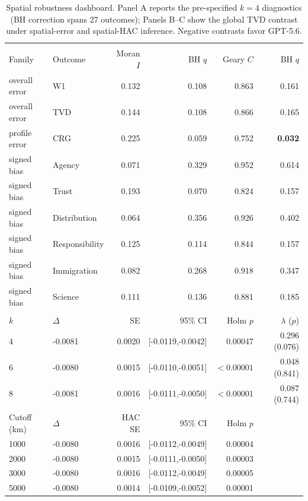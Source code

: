 \begin{table}[!htbp]
\centering
\caption{Spatial robustness dashboard. Panel A reports the pre-specified $k=4$ diagnostics (BH correction spans 27 outcomes); Panels B--C show the global TVD contrast under spatial-error and spatial-HAC inference. Negative contrasts favor GPT-5.6.}
\label{tab:spatial-global}
\small
\setlength{\tabcolsep}{3.4pt}
\begin{tabular*}{\linewidth}{@{\extracolsep{\fill}}llrrrr@{}}
\toprule
\rowcolor{tablehead}
\multicolumn{6}{l}{\textbf{A. Primary dependence diagnostics}}\\
Family & Outcome & Moran $I$ & BH $q$ & Geary $C$ & BH $q$ \\
\midrule
overall error & W1 & 0.132 & 0.108 & 0.863 & 0.161 \\
overall error & TVD & 0.144 & 0.108 & 0.866 & 0.165 \\
\rowcolor{cautionbg}
profile error & CRG & 0.225 & 0.059 & 0.752 & \textbf{0.032} \\
signed bias & Agency & 0.071 & 0.329 & 0.952 & 0.614 \\
signed bias & Trust & 0.193 & 0.070 & 0.824 & 0.157 \\
signed bias & Distribution & 0.064 & 0.356 & 0.926 & 0.402 \\
signed bias & Responsibility & 0.125 & 0.114 & 0.844 & 0.157 \\
signed bias & Immigration & 0.082 & 0.268 & 0.918 & 0.347 \\
signed bias & Science & 0.111 & 0.136 & 0.881 & 0.185 \\
\addlinespace[3pt]
\rowcolor{tablehead}
\multicolumn{6}{l}{\textbf{B. Spatial-error model: global TVD}}\\
$k$ & $\Delta$ & SE & 95\% CI & Holm $p$ & $\lambda$ ($p$) \\
\midrule
\rowcolor{improvebg}4 & -0.0081 & 0.0020 & [-0.0119,-0.0042] & 0.00047 & 0.296 (0.076) \\
\rowcolor{improvebg}6 & -0.0080 & 0.0015 & [-0.0110,-0.0051] & $<0.00001$ & 0.048 (0.841) \\
\rowcolor{improvebg}8 & -0.0081 & 0.0016 & [-0.0111,-0.0050] & $<0.00001$ & 0.087 (0.744) \\
\addlinespace[3pt]
\rowcolor{tablehead}
\multicolumn{6}{l}{\textbf{C. Spatial-HAC: global TVD}}\\
Cutoff (km) & $\Delta$ & HAC SE & 95\% CI & Holm $p$ & \\
\midrule
\rowcolor{improvebg}1000 & -0.0080 & 0.0016 & [-0.0112,-0.0049] & 0.00004 & \\
\rowcolor{improvebg}2000 & -0.0080 & 0.0015 & [-0.0111,-0.0050] & 0.00003 & \\
\rowcolor{improvebg}3000 & -0.0080 & 0.0016 & [-0.0112,-0.0049] & 0.00005 & \\
\rowcolor{improvebg}5000 & -0.0080 & 0.0014 & [-0.0109,-0.0052] & 0.00001 & \\
\bottomrule
\end{tabular*}
\end{table}
